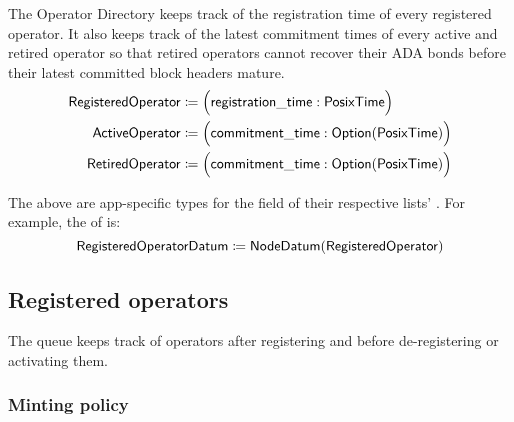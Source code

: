 \documentclass[../midgard.tex]{subfiles}
\begin{document}
The Operator Directory keeps track of the registration time of every registered operator. It also keeps track of the latest commitment times of every active and retired operator so that retired operators cannot recover their ADA bonds before their latest committed block headers mature.
\begin{align*}
    \mathsf{RegisteredOperator} &\coloneq \Bigl( \mathsf{registration\_time}: \mathsf{PosixTime} \Bigr) \\
    \mathsf{ActiveOperator}     &\coloneq \Bigl( \mathsf{commitment\_time}:
        \mathsf{Option}(\mathsf{PosixTime}) \Bigr) \\
    \mathsf{RetiredOperator}    &\coloneq \Bigl( \mathsf{commitment\_time}:
        \mathsf{Option}(\mathsf{PosixTime}) \Bigr)
\end{align*}

The above are app-specific types for the  field of their respective lists' . For example, the  of  is:
\begin{equation*}
    \mathsf{RegisteredOperatorDatum} \coloneq \mathsf{NodeDatum} (\mathsf{RegisteredOperator})
\end{equation*}

\subsection{Registered operators}
\label{h:registered-operators}

The  queue keeps track of operators after registering and before de-registering or activating them.

\subsubsection{Minting policy}
\label{h:registered-operators-minting-policy}
\end{document}
